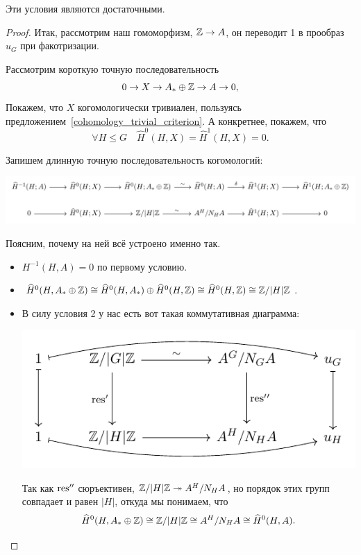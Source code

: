 	\begin{theorem}[Тейт] 
		Эти условия являются достаточными.
	\end{theorem}
	\begin{proof}
		Итак, рассмотрим наш гомоморфизм, $\mathbb{Z} \to A$, он переводит 1 в прообраз $u_{G}$ при факотризации. 

		Рассмотрим короткую точную последовательность
		\[
			 0 \to X \to A_* \oplus \mathbb{Z} \to A \to 0,
		\]
		Покажем, что $X$ когомологически тривиален, пользуясь предложением~\ref{cohomology_trivial_criterion}. А конкретнее, покажем, что 
		\[
		 	\forall H \le G \quad \widehat{H}^0(H, X) = \widehat{H}^1(H, X) = 0.
		 \] 

		Запишем длинную точную последовательность когомологий: 
		\begin{center}
			\includegraphics[scale = 0.9]{lectures/6/pictures/cd_38.pdf}
	\end{center}
		Поясним, почему на ней всё устроено именно так. 

		\begin{itemize}
			\item $H^{-1}(H, A) = 0$ по первому условию. 

			\item $\widehat{H}^0(H, A_* \oplus \mathbb{Z}) \cong \widehat{H}^0(H, A_*) \oplus \widehat{H}^0(H,\mathbb{Z}) \cong \widehat{H}^0(H,\mathbb{Z}) \cong \mathbb{Z}/|H|\mathbb{Z}$.

			\item В силу условия 2 у нас есть вот такая коммутативная диаграмма: 

			\begin{center}
				\includegraphics{lectures/6/pictures/cd_43.pdf}
			\end{center}

			Так как $\operatorname{res}''$ сюръективен, $\mathbb{Z}/|H|\mathbb{Z} \twoheadrightarrow A^H/N_H A$, но порядок этих групп совпадает и равен $|H|$, откуда мы понимаем, что 
			\[
				\widehat{H}^0(H, A_* \oplus \mathbb{Z}) \cong \mathbb{Z}/|H|\mathbb{Z} \cong A^H/N_H A \cong \widehat{H}^0(H, A).
			\]


\end{itemize}
\end{proof}
